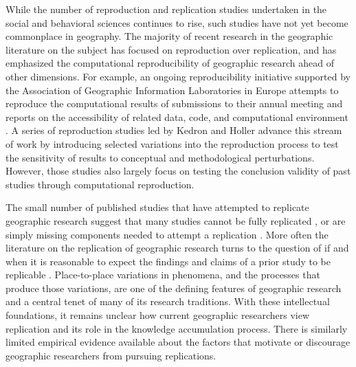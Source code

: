 \documentclass[]{interact}
\theoremstyle{plain}%
\theoremstyle{definition}
\theoremstyle{remark}
\begin{document}
While the number of reproduction and replication studies undertaken in the social and behavioral sciences continues to rise, such studies have not yet become commonplace in geography.
The majority of recent research in the geographic literature on the subject has focused on reproduction over replication, and has emphasized the computational reproducibility of geographic research ahead of other dimensions.
For example, an ongoing reproducibility initiative supported by the Association of Geographic Information Laboratories in Europe attempts to reproduce the computational results of submissions to their annual meeting and reports on the accessibility of related data, code, and computational environment \citep{nust2018, ostermann2021}.
A series of reproduction studies led by Kedron and Holler \citep{Kedron2023Beyond, Kedron_Holler_Bardin_Hilgendorf_2022} advance this stream of work by introducing selected variations into the reproduction process to test the sensitivity of results to conceptual and methodological perturbations. 
However, those studies also largely focus on testing the conclusion validity of past studies through computational reproduction. 

The small number of published studies that have attempted to replicate geographic research suggest that many studies cannot be fully replicated \citep[e.g.,][]{Kedron2022dimaggio, paez2022reproducibility}, or are simply missing components needed to attempt a replication \citep{konkol2019, ostermann2017}.
More often the literature on the replication of geographic research turns to the question of if and when it is reasonable to expect the findings and claims of a prior study to be replicable \citep{kedron2021GA, kedron2022replication, goodchild2021replication, sui2021reproducibility}. 
Place-to-place variations in phenomena, and the processes that produce those variations, are one of the defining features of geographic research and a central tenet of many of its research traditions.
With these intellectual foundations, it remains unclear how current geographic researchers view replication and its role in the knowledge accumulation process.
There is similarly limited empirical evidence available about the factors that motivate or discourage geographic researchers from pursuing replications. 
\end{document}
